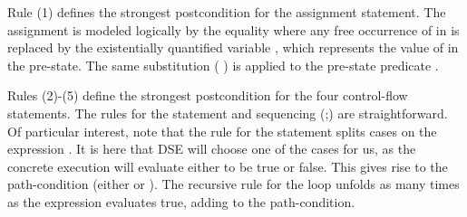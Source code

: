 \documentclass{IOS-Book-Article}
\begin{document}
\begin{mdP}[data-line={483}]%
{}Rule (1) defines the strongest postcondition for 
the assignment statement. The assignment is modeled
logically by the equality %
{}%
{} where any free occurrence of %
{}%
{} in %
{}%
{}
is replaced by the existentially quantified variable %
{}%
{}, which represents
the value of %
{}%
{} in the pre-state. The same substitution (%
{}\mdSpan[class={math-inline},elem={math-inline}]{$[x \rightarrow y ]$}%
{})
is applied to the pre-state predicate %
{}%
{}.%
\end{mdP}%
\begin{mdP}[class={indent},data-line={490}]%
{}Rules (2)-(5) define the strongest postcondition for the four control-flow
statements. The rules for the %
{}%
{} statement and sequencing (;) are
straightforward. 
Of particular interest, note that the rule for the %
{}%
{} 
statement splits cases on the expression %
{}%
{}. 
It is here that DSE will choose one of the cases for us, as the concrete
execution will evaluate %
{}%
{} either to be true or false. This gives rise
to the path-condition (either %
{}%
{} or %
{}%
{}). The
recursive rule for the %
{}%
{} loop unfolds as many times as the
expression %
{}%
{} evaluates true, adding to the path-condition.%
\end{mdP}%
\end{document}
